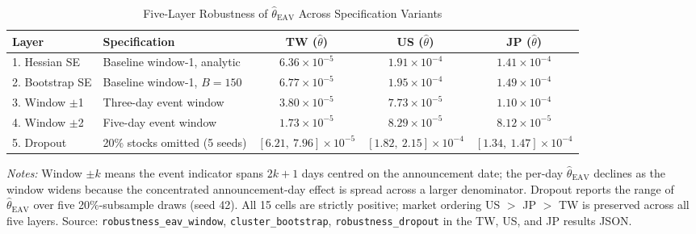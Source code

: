 \begin{table}[H]
\centering
\caption{Five-Layer Robustness of $\hat{\theta}_{\text{EAV}}$ Across Specification Variants}
\label{tab:eav_robust}
\begin{tabular}{llccc}
\toprule
Layer & Specification & TW ($\hat{\theta}$) & US ($\hat{\theta}$) & JP ($\hat{\theta}$) \\
\midrule
1. Hessian SE & Baseline window-1, analytic & $6.36 \times 10^{-5}$ & $1.91 \times 10^{-4}$ & $1.41 \times 10^{-4}$ \\
2. Bootstrap SE & Baseline window-1, $B=150$ & $6.77 \times 10^{-5}$ & $1.95 \times 10^{-4}$ & $1.49 \times 10^{-4}$ \\
3. Window $\pm$1 & Three-day event window & $3.80 \times 10^{-5}$ & $7.73 \times 10^{-5}$ & $1.10 \times 10^{-4}$ \\
4. Window $\pm$2 & Five-day event window & $1.73 \times 10^{-5}$ & $8.29 \times 10^{-5}$ & $8.12 \times 10^{-5}$ \\
5. Dropout & 20\% stocks omitted (5 seeds) & $[6.21,\ 7.96] \times 10^{-5}$ & $[1.82,\ 2.15] \times 10^{-4}$ & $[1.34,\ 1.47] \times 10^{-4}$ \\
\bottomrule
\end{tabular}
\begin{flushleft}
\small \textit{Notes:} Window $\pm k$ means the event indicator spans $2k+1$ days centred on the announcement date; the per-day $\hat{\theta}_{\text{EAV}}$ declines as the window widens because the concentrated announcement-day effect is spread across a larger denominator. Dropout reports the range of $\hat{\theta}_{\text{EAV}}$ over five 20\%-subsample draws (seed 42). All 15 cells are strictly positive; market ordering US $>$ JP $>$ TW is preserved across all five layers. Source: \texttt{robustness\_eav\_window}, \texttt{cluster\_bootstrap}, \texttt{robustness\_dropout} in the TW, US, and JP results JSON.%
\end{flushleft}
\end{table}

